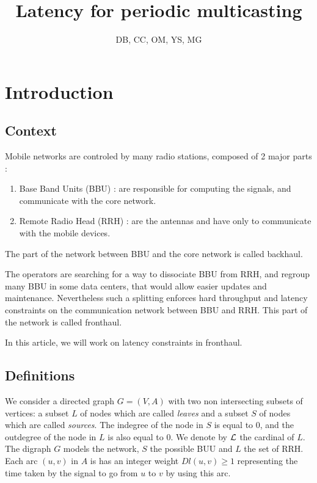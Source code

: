 \documentclass{article}
\begin{document}
\graphicspath{{figures/}}
\newtheorem{rem}{Remarque}
\newtheorem{proposition}{Proposition}
\newtheorem{theorem}{Theorem}
\newtheorem{fact}{Fact}
\newtheorem{lemma}[theorem]{Lemma}
\newtheorem{definition}{Definition}

\title{Latency for periodic multicasting}

\newcommand{\todo}[1]{}
\renewcommand{\todo}[1]{{\color{red} TODO: {#1}}}
 
\author{DB, CC, OM, YS, MG}


\maketitle

 
\section{Introduction}

\subsection{Context}
Mobile networks are controled by many radio stations, composed of 2 major parts : 
\begin{enumerate}
 \item Base Band Units (BBU) : are responsible for computing the signals, and communicate with the core network.
 \item Remote Radio Head (RRH) : are the antennas and have only to communicate with the mobile devices.
\end{enumerate}
The part of the network between BBU and the core network is called backhaul.

The operators are searching for a way to dissociate BBU from RRH, and regroup many BBU in some data centers, that would allow easier updates and 
maintenance.
Nevertheless such a splitting enforces hard throughput and latency constraints on the communication network between BBU and RRH. This part of the network is called fronthaul.

In this article, we will work on latency constraints in fronthaul.

\subsection{Definitions}
We consider a directed graph $G=(V,A)$ with two non intersecting subsets of vertices: a subset $L$ of nodes which are called \emph{leaves} and a subset $S$ of nodes which are called \emph{sources}.  
The indegree of the node in $S$ is equal to 0, and the outdegree of the node in $L$ is also equal to 0. 
We denote by ${\cal L}$ the cardinal of $L$. The digraph $G$ models the network, $S$ the possible BUU and $L$ the set of RRH.
Each arc  $(u,v)$ in $A$ is has an integer weight $Dl(u,v) \geq 1$ representing the time taken by the signal to go from $u$ to $v$
by using this arc.  
\end{document}
